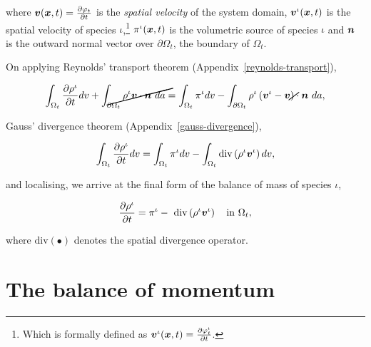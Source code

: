  where $\mbox{\boldmath$ v$}(\mbox{\boldmath$ x$},t) = \frac{\partial \varphi_{t}}{\partial t}$
is the {\em spatial velocity} of the system domain,
$\mbox{\boldmath$ v$}^{\iota}(\mbox{\boldmath$ x$},t)$ is the spatial velocity of species
$\iota$,\footnote{Which is formally defined as $\mbox{\boldmath$ v$}^{\iota}(\mbox{\boldmath$ x$},t) =
  \frac{\partial \varphi^{\iota}_{t}}{\partial t}$.} %
 $\pi^{\iota}(\mbox{\boldmath$ x$},t)$ is the volumetric source of species $\iota$ and
$\mbox{\boldmath$ n$}$ is the outward normal vector over $\partial \Omega_{t}$, the
boundary of $\Omega_{t}$.

On applying Reynolds' transport theorem (Appendix~\ref{reynolds-transport}),

\begin{equation*}
\int_{\Omega_{t}} \frac{\partial \rho^{\iota}}{\partial t} dv
+ \cancel{\int_{\partial \Omega_{t}} \rho^{\iota} \bv \cdot \bn\ da} =
\int_{\Omega_{t}} \pi^{\iota} dv
- \int_{\partial \Omega_{t}} \rho^{\iota} \left(\bv^{\iota} -
\cancel{\bv}\right) \cdot \bn\ da,
\end{equation*}

Gauss' divergence theorem (Appendix~\ref{gauss-divergence}),

\begin{equation*}
\int_{\Omega_{t}} \frac{\partial \rho^{\iota}}{\partial t} dv =
\int_{\Omega_{t}} \pi^{\iota} dv
- \int_{\Omega_{t}} \mathrm{div} \left( \rho^{\iota} \mbox{\boldmath$ v$}^{\iota}\right) dv, 
\end{equation*}

and localising, we arrive at the final form of the balance of
mass of species $\iota$,

\begin{equation}
\frac{\partial \rho^{\iota}}{\partial t}  =
\pi^{\iota}
-\ \mathrm{div} \left(\rho^{\iota} \mbox{\boldmath$ v$}^{\iota}\right)
\quad \mathrm{in}\ \Omega_{t},
\label{localbalanceofmass}
\end{equation}

where $\mathrm{div} (\bullet)$ denotes the spatial divergence
operator. %



\section{The balance of momentum}
\label{balance-of-momentum}

